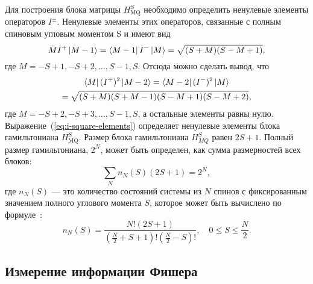 Для построения блока матрицы $H_\mathrm{MQ}^{S}$ необходимо определить ненулевые элементы операторов $I^{\pm}$.
Ненулевые элементы этих операторов, связанные с полным спиновым угловым моментом S
и имеют вид
%
\begin{equation}
  \bar{M}I^+\left| M-1 \right\rangle = \left\langle M-1 \right|I^-\left| M \right\rangle = \sqrt{(S + M)(S - M + 1)},
\end{equation}
%
где $M = -S+1, -S+2, \dots, S-1, S$. Отсюда можно сделать вывод,
что
%
\begin{multline}\label{eq:i-square-elements}
  \left\langle M \right|(I^+)^2\left| M-2 \right\rangle = \left\langle M-2 \right|(I^-)^2\left| M \right\rangle \\
  = \sqrt{(S + M)(S + M -1)(S - M + 1)(S - M + 2)},
\end{multline}
%
где $M = -S+2, -S+3, \dots, S-1, S$,
а остальные элементы равны нулю.
Выражение~(\ref{eq:i-square-elements}) определяет ненулевые элементы блока гамильтониана $H_\mathrm{MQ}^{S}$.
Размер блока гамильтониана $H_{MQ}^S$ равен $2S+1$.
Полный размер гамильтониана, $2^N$,
может быть определен, как сумма размерностей всех блоков:
%
\begin{equation}\label{eq:full-dimension}
  \sum\limits_N n_N(S)(2S+1) = 2^N,
\end{equation}
%
где $n_N(S)$ --- это количество состояний системы из $N$ спинов
с фиксированным значением полного углового момента $S$,
которое может быть вычислено по формуле~\cite{Landau3}:
%
\begin{equation}\label{eq:coeff_n}
  n_N(S)  = \dfrac{ N! (2S+1)}
  {(\frac N 2 + S + 1)!(\frac N 2 - S)!},
  \quad
  0\leq S \leq \frac N 2.
\end{equation}
%



\subsection{Измерение информации Фишера}
\label{sec:quantum-fisher-information-mesuarement-at-high-temperature}

